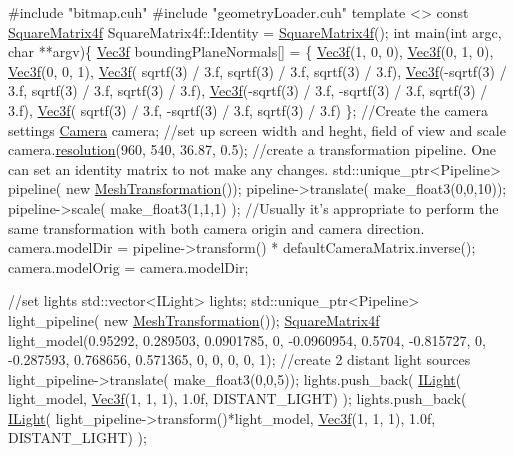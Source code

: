 \begin{DoxyCode}
\textcolor{preprocessor}{#include "bitmap.cuh"}
\textcolor{preprocessor}{#include "geometryLoader.cuh"}
\textcolor{keyword}{template} <> \textcolor{keyword}{const} \hyperlink{class_square_matrix4}{SquareMatrix4f} SquareMatrix4f::Identity = 
      \hyperlink{class_square_matrix4}{SquareMatrix4f}();
\textcolor{keywordtype}{int} main(\textcolor{keywordtype}{int} argc, \textcolor{keywordtype}{char} **argv)\{
    \hyperlink{class_vec3}{Vec3f} boundingPlaneNormals[] = \{
            \hyperlink{class_vec3}{Vec3f}(1, 0, 0),
            \hyperlink{class_vec3}{Vec3f}(0, 1, 0),
            \hyperlink{class_vec3}{Vec3f}(0, 0, 1),
            \hyperlink{class_vec3}{Vec3f}( sqrtf(3) / 3.f,  sqrtf(3) / 3.f, sqrtf(3) / 3.f),
            \hyperlink{class_vec3}{Vec3f}(-sqrtf(3) / 3.f,  sqrtf(3) / 3.f, sqrtf(3) / 3.f),
            \hyperlink{class_vec3}{Vec3f}(-sqrtf(3) / 3.f, -sqrtf(3) / 3.f, sqrtf(3) / 3.f),
            \hyperlink{class_vec3}{Vec3f}( sqrtf(3) / 3.f, -sqrtf(3) / 3.f, sqrtf(3) / 3.f) \};
        \textcolor{comment}{//Create the camera settings}
        \hyperlink{struct_camera}{Camera} camera;
        \textcolor{comment}{//set up screen width and heght, field of view and scale}
        camera.\hyperlink{struct_camera_ab0cbf1b102afdeb285ef2be271d1701c}{resolution}(960, 540, 36.87, 0.5);
        \textcolor{comment}{//create a transformation pipeline. One can set an identity matrix to not make any changes.}
        std::unique\_ptr<Pipeline> pipeline( \textcolor{keyword}{new} \hyperlink{class_mesh_transformation}{MeshTransformation}());
        pipeline->translate( make\_float3(0,0,10));
        pipeline->scale( make\_float3(1,1,1) );
        \textcolor{comment}{//Usually it's appropriate to perform the same transformation with both camera origin and camera
       direction.}
        camera.modelDir = pipeline->transform() * defaultCameraMatrix.inverse();
        camera.modelOrig = camera.modelDir;


        \textcolor{comment}{//set lights}
        std::vector<ILight> lights;
        std::unique\_ptr<Pipeline> light\_pipeline( \textcolor{keyword}{new} \hyperlink{class_mesh_transformation}{MeshTransformation}());
        \hyperlink{class_square_matrix4}{SquareMatrix4f} light\_model(0.95292, 0.289503, 0.0901785, 0,
                      -0.0960954, 0.5704, -0.815727, 0,
                      -0.287593, 0.768656, 0.571365, 0,
                    0, 0, 0, 1);
        \textcolor{comment}{//create 2 distant light sources}
        light\_pipeline->translate( make\_float3(0,0,5));
        lights.push\_back( \hyperlink{class_i_light}{ILight}( light\_model, \hyperlink{class_vec3}{Vec3f}(1, 1, 1), 1.0f, DISTANT\_LIGHT) );
        lights.push\_back( \hyperlink{class_i_light}{ILight}( light\_pipeline->transform()*light\_model, 
      \hyperlink{class_vec3}{Vec3f}(1, 1, 1), 1.0f, DISTANT\_LIGHT) );


\end{DoxyCode}
